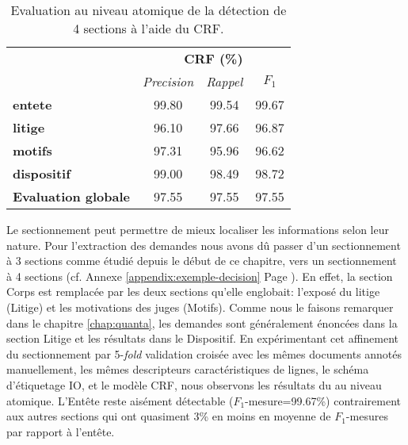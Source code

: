 \begin{table}[!htb]
	\footnotesize
	\centering
	\begin{tabular}{|l|c|c|c|}
		\hline
		\multirow{2}{*}{}	&      \multicolumn{3}{|c|}{\textbf{CRF (\%)}}          \\ \cline{2-4} & \textit{Precision} & \textit{Rappel} & $F_1$ \\ \hline
		\textbf{entete} &   99.80 &	99.54 &	99.67      \\ 
		\textbf{litige}      &  96.10 &	97.66	& 96.87       \\ 
		\textbf{motifs}      &   97.31	&95.96	&96.62 \\
		\textbf{dispositif}    &   99.00&	98.49&	98.72  \\ \hline
		\textbf{Evaluation globale} &97.55	&97.55	&97.55       \\ \hline
	\end{tabular}
	\caption{Evaluation au niveau atomique de la détection de 4 sections à l'aide du CRF.} \label{tab:structuration:5folccvCRF-4sections}
\end{table}

Le sectionnement peut permettre de mieux localiser les informations selon leur nature. Pour l'extraction des demandes nous avons dû passer d'un sectionnement à 3 sections comme étudié depuis le début de ce chapitre, vers un sectionnement à 4 sections (cf. Annexe \ref{appendix:exemple-decision} Page \pageref{appendix:exemple-decision}). En effet, la section Corps est remplacée par les deux sections qu'elle englobait: l'exposé du litige (Litige) et les motivations des juges (Motifs). Comme nous le faisons remarquer dans le chapitre \ref{chap:quanta}, les demandes sont généralement énoncées dans la section Litige et les résultats dans le Dispositif. En expérimentant cet affinement du sectionnement par 5-\textit{fold} validation croisée avec les mêmes documents annotés manuellement, les mêmes descripteurs caractéristiques de lignes, le schéma d'étiquetage IO, et le modèle CRF, nous observons les résultats du  au niveau atomique. L'Entête reste aisément détectable ($F_1$-mesure=99.67\%) contrairement aux autres sections qui ont quasiment 3\% en moins en moyenne de $F_1$-mesures par rapport à l'entête.


